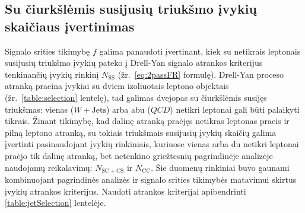 \documentclass[a4paper, 12pt, oneside]{article}
\newcommand{\WJets}{W\! +\!\mathrm{Jets}}
\newcommand{\QCD}{QC\! D}
\newlength\q
\begin{document}
\subsection{Su čiurkšlėmis susijusių triukšmo įvykių skaičiaus įvertinimas} \label{sec:bkgEst}
Signalo srities tikimybę $f$ galima panaudoti įvertinant, kiek su netikrais leptonais susijusių
triukšmo įvykių pateko į Drell-Yan signalo atrankos kriterijus tenkinančių įvykių rinkinį $N_{\mathrm{SS}}$
(žr.\ \eqref{eq:2passFR} formulę).
Drell-Yan proceso atranką praeina įvykiai su dviem izoliuotais leptono objektais (žr.\ \ref{table:selection} lentelę),
tad galimas dvejopas su čiurkšlėmis susijęs triukšmas: vienas ($\WJets$) arba abu ($\QCD$) netikri leptonai gali būti
palaikyti tikrais.
Žinant tikimybę, kad dalinę atranką praėjęs netikras leptonas praeis ir pilną leptono atranką, su tokiais triukšmais
susijusių įvykių skaičių galima įvertinti pasinaudojant įvykių rinkiniais, kuriuose vienas arba du netikri leptonai
praėjo tik dalinę atranką, bet netenkino griežtesnių pagrindinėje analizėje naudojamų reikalavimų:
$N_{\mathrm{SC+CS}}$ ir $N_{\mathrm{CC}}$.
Šie duomenų rinkiniai buvo gaunami kombinuojant pagrindinės analizės ir signalo srities tikimybės matavimui skirtus
įvykių atrankos kriterijus.
Naudoti atrankos kriterijai apibendrinti \ref{table:jetSelection} lentelėje.
\end{document}
